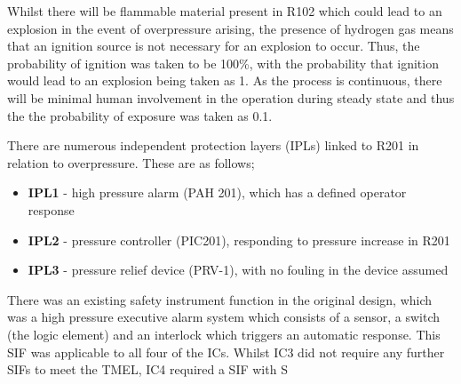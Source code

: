 Whilst there will be flammable material present in R102 which could lead to an explosion in the event of overpressure arising, the presence of hydrogen gas means that an ignition source is not necessary for an explosion to occur. Thus, the probability of ignition was taken to be 100\%, with the probability that ignition would lead to an explosion being taken as 1. As the process is continuous, there will be minimal human involvement in the operation during steady state and thus the the probability of exposure was taken as 0.1. 

There are numerous  independent protection layers (IPLs) linked to R201 in relation to overpressure. These are as follows;
 
 \begin{itemize}
\item \textbf{IPL1} - high pressure alarm (PAH 201), which has a defined operator response
\item  \textbf{IPL2} - pressure controller (PIC201), responding to pressure increase in R201
\item  \textbf{IPL3} - pressure relief device (PRV-1), with no fouling in the device assumed
 \end{itemize}


There was an existing safety instrument function in the original design, which was a high pressure executive alarm system which consists of a sensor, a switch (the logic element) and an interlock which triggers an automatic response. This SIF was applicable to all four of the ICs. Whilst IC3 did not require any further SIFs to meet the TMEL, IC4 required a SIF with S










 